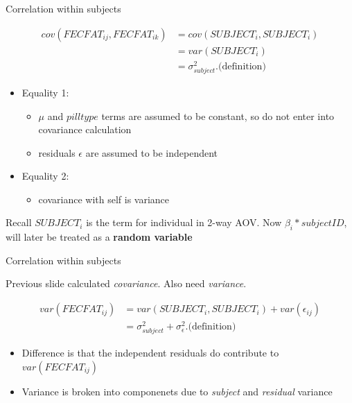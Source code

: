 \documentclass[
  ignorenonframetext,
]{beamer}
\providecommand{\tightlist}{%
  \setlength{\itemsep}{0pt}\setlength{\parskip}{0pt}}
\begin{document}
\begin{frame}{Correlation within subjects}
\protect\hypertarget{correlation-within-subjects}{}

\begin{equation*}
\begin{aligned}
cov(FECFAT_{ij}, FECFAT_{ik}) &= cov(SUBJECT_i, SUBJECT_i) \\
                              &= var(SUBJECT_i) \\
                              &= \sigma_{subject}^2. \textrm{(definition)}
\end{aligned}
\end{equation*}

\begin{itemize}
\tightlist
\item
  Equality 1:

  \begin{itemize}
  \tightlist
  \item
    \(\mu\) and \(pilltype\) terms are assumed to be constant, so do not
    enter into covariance calculation
  \item
    residuals \(\epsilon\) are assumed to be independent
  \end{itemize}
\item
  Equality 2:

  \begin{itemize}
  \tightlist
  \item
    covariance with self is variance
  \end{itemize}
\end{itemize}

Recall \(SUBJECT_i\) is the term for individual in 2-way AOV. Now
\(\beta_i * subjectID\), will later be treated as a \textbf{random
variable}

\end{frame}

\begin{frame}{Correlation within subjects}
\protect\hypertarget{correlation-within-subjects-1}{}

Previous slide calculated \emph{covariance}. Also need \emph{variance}.

\begin{equation*}
\begin{aligned}
var(FECFAT_{ij}) &= var(SUBJECT_i, SUBJECT_i) + var(\epsilon_{ij}) \\
                              &= \sigma_{subject}^2 + \sigma_{\epsilon}^2. \textrm{(definition)}
\end{aligned}
\end{equation*}

\begin{itemize}
\tightlist
\item
  Difference is that the independent residuals do contribute to
  \(var(FECFAT_{ij})\)
\item
  Variance is broken into componenets due to \emph{subject} and
  \emph{residual} variance
\end{itemize}

\end{frame}
\end{document}
